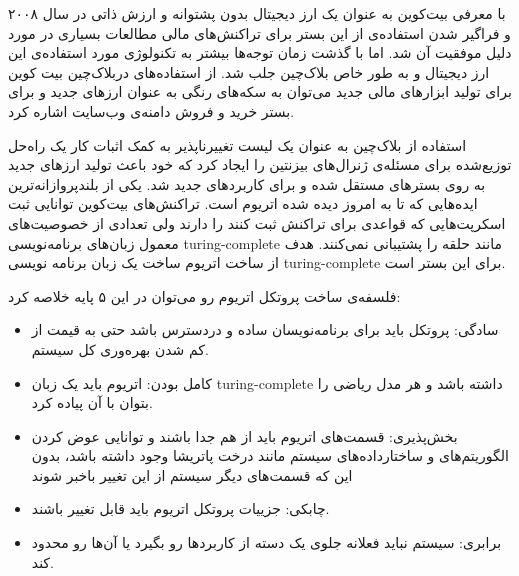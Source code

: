 \par
با معرفی بیت‌کوین به عنوان یک ارز دیجیتال بدون پشتوانه و ارزش ذاتی در سال ۲۰۰۸ و فراگیر شدن استفاده‌ی از این بستر برای تراکنش‌های مالی مطالعات بسیاری در مورد دلیل موفقیت آن شد. اما با گذشت زمان توجه‌ها بیشتر به تکنولوژی مورد استفاده‌ی این ارز دیجیتال و به طور خاص بلاک‌چین جلب شد.
از استفاده‌های دربلاک‌چین بیت کوین برای تولید ابزارهای مالی جدید می‌توان به سکه‌های رنگی به عنوان ارزهای جدید و
  برای بستر خرید و فروش دامنه‌ی وب‌سایت اشاره کرد. 
\par
استفاده از بلاک‌چین به عنوان یک لیست تغییرناپذیر به کمک اثبات کار یک راه‌حل توزیع‌شده برای مسئله‌ی ژنرال‌های بیزنتین را ایجاد کرد که خود باعث تولید ارزهای جدید به روی بسترهای مستقل شده و برای کاربردهای جدید شد. یکی از بلندپروازانه‌ترین ایده‌هایی که تا به امروز دیده شده اتریوم است. تراکنش‌های بیت‌کوین توانایی ثبت اسکرپت‌هایی که قواعدی برای تراکنش ثبت کنند را دارند ولی تعدادی از خصوصیت‌های معمول زبان‌های برنامه‌نویسی turing-complete مانند حلقه را پشتیبانی نمی‌کنند. هدف از ساخت اتریوم ساخت یک زبان برنامه نویسی turing-complete برای این بستر است. 
\par
فلسفه‌ی ساخت پروتکل اتریوم رو می‌توان در این ۵ پایه خلاصه کرد: 
\begin{itemize}
	\item
سادگی: پروتکل باید برای برنامه‌نویسان ساده و دردسترس باشد حتی به قیمت از کم شدن بهره‌وری کل سیستم.
\item  
کامل بودن: اتریوم باید یک زبان turing-complete داشته باشد و هر مدل ریاضی را بتوان با آن پیاده کرد. 
\item
بخش‌پذیری: قسمت‌های اتریوم باید از هم جدا باشند و توانایی عوض کردن الگوریتم‌های و ساختارداده‌های سیستم مانند درخت پاتریشا وجود داشته باشد، بدون این که قسمت‌های دیگر سیستم از این تغییر باخبر شوند
\item
چابکی: جزییات پروتکل اتریوم باید قابل تغییر باشند. 
\item
برابری: سیستم نباید فعلانه جلوی یک دسته از کاربردها رو بگیرد یا آن‌ها رو محدود کند.
\end{itemize}
\par
